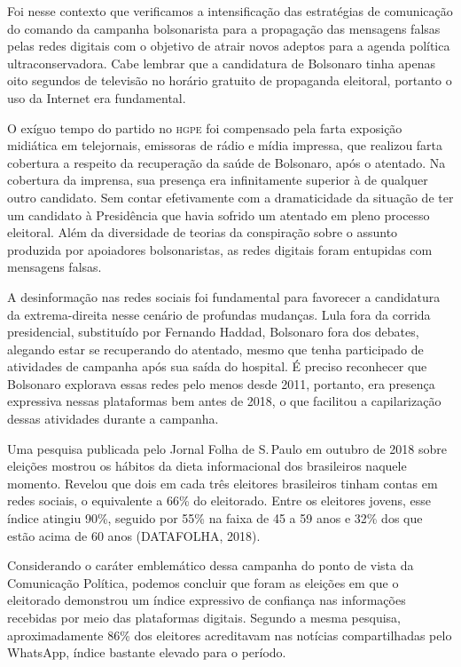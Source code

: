 Foi nesse contexto que verificamos a intensificação das estratégias de
comunicação do comando da campanha bolsonarista para a propagação das
mensagens falsas pelas redes digitais com o objetivo de atrair novos
adeptos para a agenda política ultraconservadora. Cabe lembrar que a
candidatura de Bolsonaro tinha apenas oito segundos de televisão no
horário gratuito de propaganda eleitoral, portanto o uso da Internet era
fundamental.

O exíguo tempo do partido no \textsc{hgpe} foi compensado pela farta exposição
midiática em telejornais, emissoras de rádio e mídia impressa, que
realizou farta cobertura a respeito da recuperação da saúde de
Bolsonaro, após o atentado. Na cobertura da imprensa, sua presença era 
infinitamente superior à de qualquer outro candidato. Sem contar efetivamente 
com a dramaticidade da situação de ter um candidato à Presidência que havia 
sofrido um atentado em pleno processo eleitoral. Além da diversidade de teorias 
da conspiração sobre o assunto produzida por apoiadores bolsonaristas, as redes digitais
foram entupidas com mensagens falsas.

A desinformação nas redes sociais foi fundamental para favorecer a
candidatura da extrema-direita nesse cenário de profundas mudanças. Lula
fora da corrida presidencial, substituído por Fernando Haddad, Bolsonaro
fora dos debates, alegando estar se recuperando do atentado, mesmo que
tenha participado de atividades de campanha após sua saída do hospital.
É preciso reconhecer que Bolsonaro explorava essas redes pelo menos
desde 2011, portanto, era presença expressiva nessas plataformas bem
antes de 2018, o que facilitou a capilarização dessas atividades durante
a campanha.

Uma pesquisa publicada pelo Jornal Folha de S.\,Paulo em outubro de 2018
sobre eleições mostrou os hábitos da dieta informacional dos brasileiros
naquele momento. Revelou que dois em cada três eleitores brasileiros
tinham contas em redes sociais, o equivalente a 66\% do eleitorado.
Entre os eleitores jovens, esse índice atingiu 90\%, seguido por 55\% na
faixa de 45 a 59 anos e 32\% dos que estão acima de 60 anos (DATAFOLHA,
2018).

Considerando o caráter emblemático dessa campanha do ponto de vista da
Comunicação Política, podemos concluir que foram as eleições em que o
eleitorado demonstrou um índice expressivo de confiança nas informações
recebidas por meio das plataformas digitais. Segundo a mesma pesquisa,
aproximadamente 86\% dos eleitores acreditavam nas notícias
compartilhadas pelo WhatsApp, índice bastante elevado para o período.

